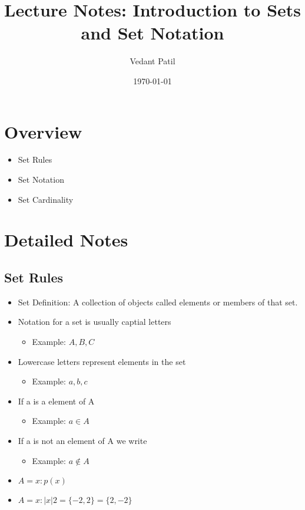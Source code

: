 \documentclass[12pt,a4paper]{article}
\title{Lecture Notes: Introduction to Sets and Set Notation}
\author{Vedant Patil}
\date{\today}
\begin{document}
\maketitle

\section{Overview}
\begin{tcolorbox}[colback=yellow!10!white,colframe=yellow!50!black,title=Key Points]
  \begin{itemize}
    \item Set Rules
    \item Set Notation 
    \item Set Cardinality
  \end{itemize}
\end{tcolorbox}

\section{Detailed Notes}
\subsection{Set Rules}
\begin{itemize}
  \item Set Definition: A collection of objects called elements or members of that set. 
  \item Notation for a set is usually captial letters 
    \begin{itemize}
      \item Example: \( A, B, C \)
    \end{itemize}
    \item Lowercase letters represent elements in the set 
      \begin{itemize}
        \item Example: \( a, b, c \) 
      \end{itemize}
    \item If a is a element of A 
      \begin{itemize}
        \item Example: \( a \in A \)
      \end{itemize}
    \item If a is not an element of A we write 
      \begin{itemize}
        \item Example: \( a \notin A \)
      \end{itemize}
    \item \( A = { x : p(x)} \)
    \item \(  A = {x : |x| 2} = \{-2, 2\}= \{ 2, -2 \} \)
\end{itemize}
\end{document}
